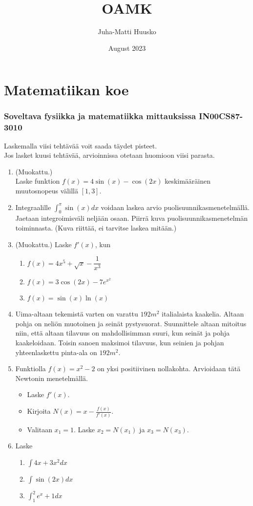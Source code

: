 \documentclass[12pt]{article}
\title{OAMK}
\author{Juha-Matti Huusko}
\date{August 2023}
\begin{document}

\tableofcontents

\section{Matematiikan koe}
\subsubsection*{Soveltava fysiikka ja matematiikka mittauksissa IN00CS87-3010}

Laskemalla viisi tehtävää voit saada täydet pisteet.\\ Jos lasket kuusi tehtävää, arvioinnissa otetaan huomioon viisi parasta.

\begin{enumerate}
\item (Muokattu.)\\ Laske funktion $f(x)=4\sin(x)-\cos(2x)$ keskimääräinen muutosnopeus välillä $[1,3]$.
\item Integraalille $\int_0^\pi \sin(x)dx$ voidaan laskea arvio puolisuunnikasmenetelmällä. Jaetaan integroimisväli neljään osaan. Piirrä kuva puolisuunnikasmenetelmän toiminnasta. (Kuva riittää, ei tarvitse laskea mitään.)
\item (Muokattu.) Laske $f'(x)$, kun
\begin{enumerate}
\item $f(x)=4x^5+\sqrt{x}-\dfrac{1}{x^3}$
\item $f(x)=3\cos(2x)-7e^{x^2}$
\item $f(x)=\sin(x)\ln(x)$
\end{enumerate}
\item Uima-altaan tekemistä varten on varattu $192 m^2$ italialaista kaakelia. Altaan pohja on neliön muotoinen ja seinät pystysuorat. Suunnittele altaan mitoitus niin, että altaan tilavuus on mahdollisimman suuri, kun seinät ja pohja kaakeloidaan. Toisin sanoen maksimoi tilavuus, kun seinien ja pohjan yhteenlaskettu pinta-ala on $192m^2$.
 \item Funktiolla $f(x)=x^2-2$ on yksi positiivinen nollakohta. Arvioidaan tätä Newtonin menetelmällä.
\begin{itemize}
\item Laske $f'(x)$.
\item Kirjoita $N(x)=x-\frac{f(x)}{f'(x)}$.
\item Valitaan $x_1=1$. Laske $x_2=N(x_1)$ ja $x_3=N(x_3)$.
\end{itemize}
\item Laske
\begin{enumerate}
\item $\int 4x+3x^2dx$
\item $\int \sin(2x)dx$
\item $\int_1^2 e^{x}+1dx$
\end{enumerate}
\end{enumerate}
\end{document}
